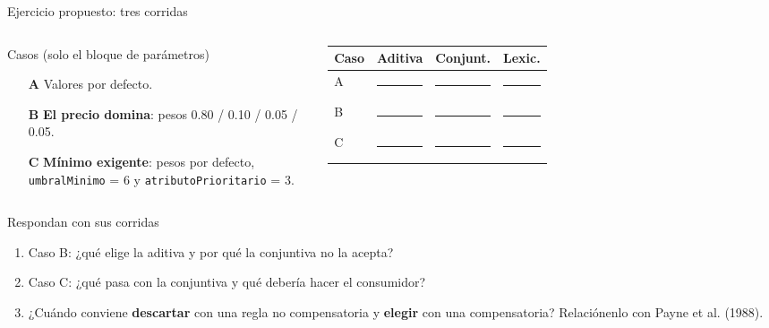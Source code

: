 \documentclass[aspectratio=169,xcolor=dvipsnames]{beamer}
\begin{document}
\begin{frame}{Ejercicio propuesto: tres corridas}
\begin{columns}[T]
  \begin{exampleblock}{Casos (solo el bloque de parámetros)}
    \scriptsize
    \begin{itemize}
      \item[\textbf{A}] Valores por defecto.
      \item[\textbf{B}] \textbf{El precio domina}: pesos 0.80 / 0.10 / 0.05 / 0.05.
      \item[\textbf{C}] \textbf{Mínimo exigente}: pesos por defecto, \texttt{umbralMinimo} = 6 y \texttt{atributoPrioritario} = 3.
    \end{itemize}
  \end{exampleblock}
  \footnotesize
  \begin{tabular}{@{}lccc@{}}
    \toprule
    Caso & Aditiva & Conjunt. & Lexic. \\
    \midrule
    A & \rule{0.9cm}{0.4pt} & \rule{0.9cm}{0.4pt} & \rule{0.9cm}{0.4pt} \\[2pt]
    B & \rule{0.9cm}{0.4pt} & \rule{0.9cm}{0.4pt} & \rule{0.9cm}{0.4pt} \\[2pt]
    C & \rule{0.9cm}{0.4pt} & \rule{0.9cm}{0.4pt} & \rule{0.9cm}{0.4pt} \\
    \bottomrule
  \end{tabular}
\end{columns}
\vspace{2pt}
\begin{block}{Respondan con sus corridas}
  \scriptsize
  \begin{enumerate}
    \item Caso B: ¿qué elige la aditiva y por qué la conjuntiva no la acepta?
    \item Caso C: ¿qué pasa con la conjuntiva y qué debería hacer el consumidor?
    \item ¿Cuándo conviene \textbf{descartar} con una regla no compensatoria y \textbf{elegir} con una compensatoria? Relaciónenlo con Payne et al. (1988).
  \end{enumerate}
\end{block}
\end{frame}
\end{document}
